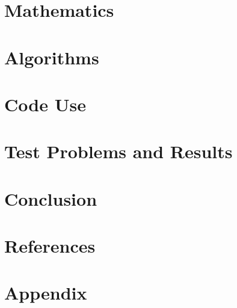\documentclass[10pt]{article}
\numberwithin{equation}{section} %
\begin{document}
\section{Mathematics}
\section{Algorithms}
\section{Code Use}
\section{Test Problems and Results}
\section{Conclusion}
\section{References}
\section{Appendix}
\end{document}
